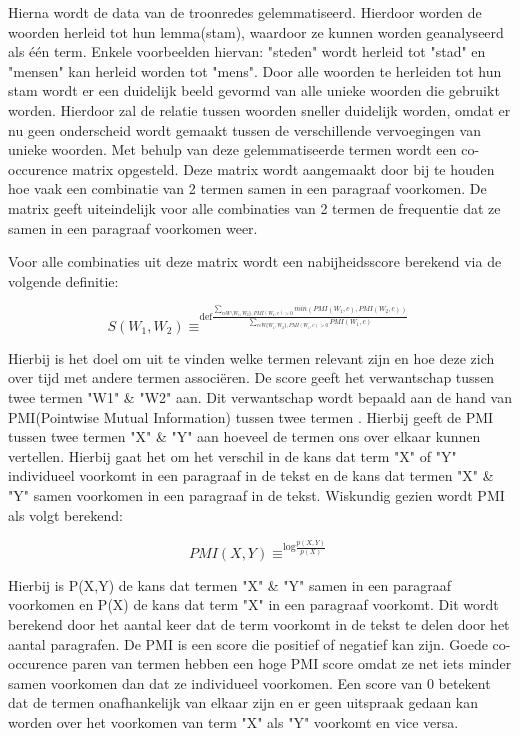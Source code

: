 Hierna wordt de data van de troonredes gelemmatiseerd. Hierdoor worden de woorden herleid tot hun lemma(stam), waardoor ze kunnen worden geanalyseerd als één term. Enkele voorbeelden hiervan: "steden" wordt herleid tot "stad" en "mensen" kan herleid worden tot "mens". Door alle woorden te herleiden tot hun stam wordt er een duidelijk beeld gevormd van alle unieke woorden die gebruikt worden. Hierdoor zal de relatie tussen woorden sneller duidelijk worden, omdat er nu geen onderscheid wordt gemaakt tussen de verschillende vervoegingen van unieke woorden. Met behulp van deze gelemmatiseerde termen wordt een co-occurence matrix opgesteld. Deze matrix wordt aangemaakt door bij te houden hoe vaak een combinatie van 2 termen samen in een paragraaf voorkomen. De matrix geeft uiteindelijk voor alle combinaties van 2 termen de frequentie dat ze samen in een paragraaf voorkomen weer.

Voor alle combinaties uit deze matrix wordt een nabijheidsscore berekend via de volgende definitie: 

 $$S(W_1,W_2)\equiv^{\mathrm{def}\frac{\sum_{c\epsilon W\setminus{W_1,W_2\},PMI(W_1,c)>0}}min(PMI(W_1,c),PMI(W_2,c))}{\sum_{c\epsilon W\{W_1,W_2\},PMI(W_1,c)>0}PMI(W_1,c)}}$$ 

Hierbij is het doel om uit te vinden welke termen relevant zijn en hoe deze zich over tijd met andere termen associëren. De score geeft het verwantschap tussen twee termen "W1" \& "W2" aan. Dit verwantschap wordt bepaald aan de hand van PMI(Pointwise Mutual Information) tussen twee termen \citep{bouma2009normalized}. Hierbij geeft de PMI tussen twee termen "X" \& "Y" aan hoeveel de termen ons over elkaar kunnen vertellen. Hierbij gaat het om het verschil in de kans dat term "X" of "Y" individueel voorkomt in een paragraaf in de tekst en de kans dat termen "X" \& "Y" samen voorkomen in een paragraaf in de tekst. Wiskundig gezien wordt PMI als volgt berekend: 

$$PMI(X,Y)\equiv^{\mathrm{log}\frac{p(X,Y)}{p(X)}}$$

Hierbij is P(X,Y) de kans dat termen "X" \& "Y" samen in een paragraaf voorkomen en P(X) de kans dat term "X" in een paragraaf voorkomt. Dit wordt berekend door het aantal keer dat de term voorkomt in de tekst te delen door het aantal paragrafen. De PMI is een score die positief of negatief kan zijn. Goede co-occurence paren van termen hebben een hoge PMI score omdat ze net iets minder samen voorkomen dan dat ze individueel voorkomen.  Een score van 0 betekent dat de termen onafhankelijk van elkaar zijn en er geen uitspraak gedaan kan worden over het voorkomen van term "X" als "Y" voorkomt en vice versa.

